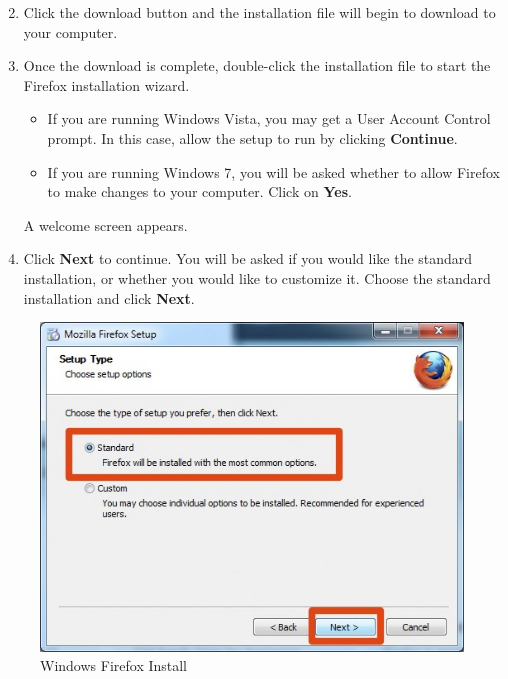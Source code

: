 \begin{enumerate}[1.]
\setcounter{enumi}{1}
\item
  Click the download button and the installation file will begin to
  download to your computer.
\item
  Once the download is complete, double-click the installation file to
  start the Firefox installation wizard.

  \begin{itemize}
  \item
    If you are running Windows Vista, you may get a User Account Control
    prompt. In this case, allow the setup to run by clicking
    \textbf{Continue}.
  \item
    If you are running Windows 7, you will be asked whether to allow
    Firefox to make changes to your computer. Click on \textbf{Yes}.
  \end{itemize}
  A welcome screen appears.
\item
  Click \textbf{Next} to continue. You will be asked if you would like
  the standard installation, or whether you would like to customize it.
  Choose the standard installation and click \textbf{Next}.
\end{enumerate}
\begin{figure}[htbp]
\centering
\includegraphics{ff_win_inst_2.png}
\caption{Windows Firefox Install}
\end{figure}

